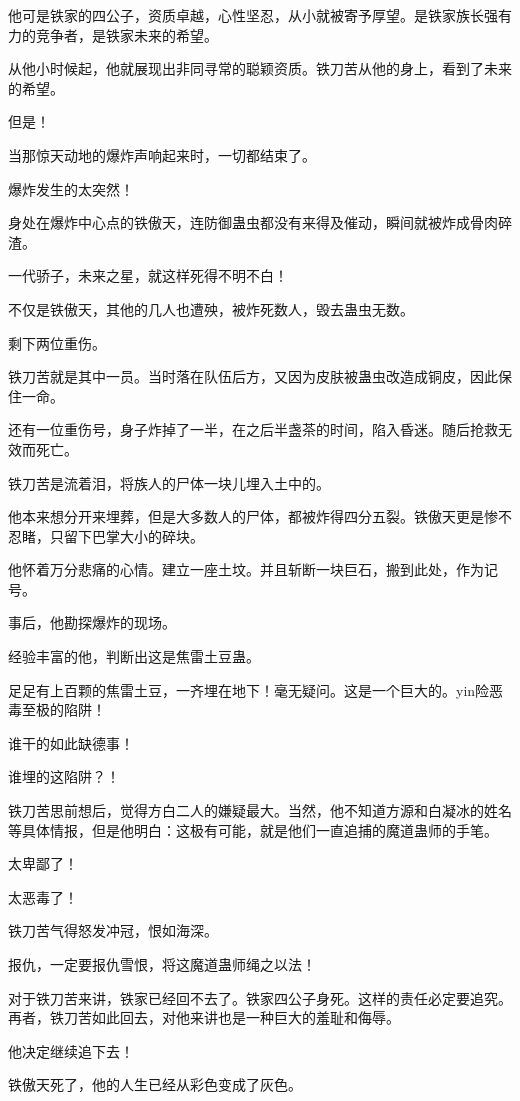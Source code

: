 \begin{this_body}
他可是铁家的四公子，资质卓越，心性坚忍，从小就被寄予厚望。是铁家族长强有力的竞争者，是铁家未来的希望。

从他小时候起，他就展现出非同寻常的聪颖资质。铁刀苦从他的身上，看到了未来的希望。

但是！

当那惊天动地的爆炸声响起来时，一切都结束了。

爆炸发生的太突然！

身处在爆炸中心点的铁傲天，连防御蛊虫都没有来得及催动，瞬间就被炸成骨肉碎渣。

一代骄子，未来之星，就这样死得不明不白！

不仅是铁傲天，其他的几人也遭殃，被炸死数人，毁去蛊虫无数。

剩下两位重伤。

铁刀苦就是其中一员。当时落在队伍后方，又因为皮肤被蛊虫改造成铜皮，因此保住一命。

还有一位重伤号，身子炸掉了一半，在之后半盏茶的时间，陷入昏迷。随后抢救无效而死亡。

铁刀苦是流着泪，将族人的尸体一块儿埋入土中的。

他本来想分开来埋葬，但是大多数人的尸体，都被炸得四分五裂。铁傲天更是惨不忍睹，只留下巴掌大小的碎块。

他怀着万分悲痛的心情。建立一座土坟。并且斩断一块巨石，搬到此处，作为记号。

事后，他勘探爆炸的现场。

经验丰富的他，判断出这是焦雷土豆蛊。

足足有上百颗的焦雷土豆，一齐埋在地下！毫无疑问。这是一个巨大的。yin险恶毒至极的陷阱！

谁干的如此缺德事！

谁埋的这陷阱？！

铁刀苦思前想后，觉得方白二人的嫌疑最大。当然，他不知道方源和白凝冰的姓名等具体情报，但是他明白：这极有可能，就是他们一直追捕的魔道蛊师的手笔。

太卑鄙了！

太恶毒了！

铁刀苦气得怒发冲冠，恨如海深。

报仇，一定要报仇雪恨，将这魔道蛊师绳之以法！

对于铁刀苦来讲，铁家已经回不去了。铁家四公子身死。这样的责任必定要追究。再者，铁刀苦如此回去，对他来讲也是一种巨大的羞耻和侮辱。

他决定继续追下去！

铁傲天死了，他的人生已经从彩色变成了灰色。


\end{this_body}
